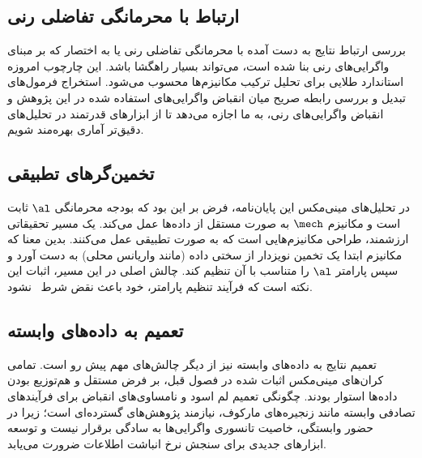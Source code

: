 \subsection{ارتباط با محرمانگی تفاضلی رنی}
بررسی ارتباط نتایج به دست آمده با محرمانگی تفاضلی رنی یا به اختصار  که بر مبنای واگرایی‌های رنی بنا شده است، می‌تواند بسیار راهگشا باشد. این چارچوب امروزه استاندارد طلایی برای تحلیل ترکیب مکانیزم‌ها محسوب می‌شود. استخراج فرمول‌های تبدیل و بررسی رابطه صریح میان انقباض واگرایی‌های استفاده شده در این پژوهش و انقباض واگرایی‌های رنی، به ما اجازه می‌دهد تا از ابزارهای قدرتمند  در تحلیل‌های دقیق‌تر آماری بهره‌مند شویم.

\subsection{تخمین‌گرهای تطبیقی}
در تحلیل‌های مینی‌مکس این پایان‌نامه، فرض بر این بود که بودجه محرمانگی $\al$ ثابت است و مکانیزم $\mech$ به صورت مستقل از داده‌ها عمل می‌کند. یک مسیر تحقیقاتی ارزشمند، طراحی مکانیزم‌هایی است که به صورت تطبیقی عمل می‌کنند. بدین معنا که مکانیزم ابتدا یک تخمین نویزدار از سختی داده (مانند واریانس محلی) به دست آورد و سپس پارامتر $\al$ را متناسب با آن تنظیم کند. چالش اصلی در این مسیر، اثبات این نکته است که فرآیند تنظیم پارامتر، خود باعث نقض شرط \LDP\ نشود.

\subsection{تعمیم به داده‌های وابسته}
تعمیم نتایج به داده‌های وابسته نیز از دیگر چالش‌های مهم پیش رو است. تمامی کران‌های مینی‌مکس اثبات شده در فصول قبل، بر فرض مستقل و هم‌توزیع بودن داده‌ها استوار بودند. چگونگی تعمیم لم اسود و نامساوی‌های انقباض برای فرآیندهای تصادفی وابسته مانند زنجیره‌های مارکوف، نیازمند پژوهش‌های گسترده‌ای است؛ زیرا در حضور وابستگی، خاصیت تانسوری واگرایی‌ها به سادگی برقرار نیست و توسعه ابزارهای جدیدی برای سنجش نرخ انباشت اطلاعات ضرورت می‌یابد.